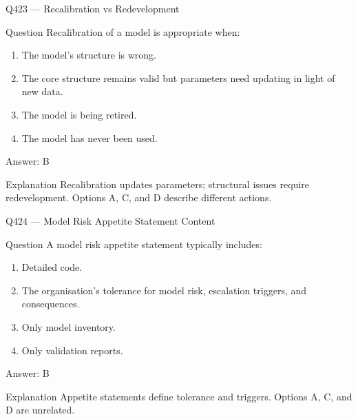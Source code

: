 \documentclass[aspectratio=169,8pt]{beamer}
\begin{document}
	
	
	\begin{frame}{Q423 --- Recalibration vs Redevelopment}
		\begin{block}{Question}
			Recalibration of a model is appropriate when:
			\begin{enumerate}
				\item The model's structure is wrong.
				\item The core structure remains valid but parameters need updating in light of new data.
				\item The model is being retired.
				\item The model has never been used.
			\end{enumerate}
		\end{block}
		\begin{exampleblock}{Answer: B}\end{exampleblock}
		\begin{block}{Explanation}
			Recalibration updates parameters; structural issues require redevelopment. Options A, C, and D describe different actions.
		\end{block}
	\end{frame}
	
	\begin{frame}{Q424 --- Model Risk Appetite Statement Content}
		\begin{block}{Question}
			A model risk appetite statement typically includes:
			\begin{enumerate}
				\item Detailed code.
				\item The organisation's tolerance for model risk, escalation triggers, and consequences.
				\item Only model inventory.
				\item Only validation reports.
			\end{enumerate}
		\end{block}
		\begin{exampleblock}{Answer: B}\end{exampleblock}
		\begin{block}{Explanation}
			Appetite statements define tolerance and triggers. Options A, C, and D are unrelated.
		\end{block}
	\end{frame}
	
\end{document}
